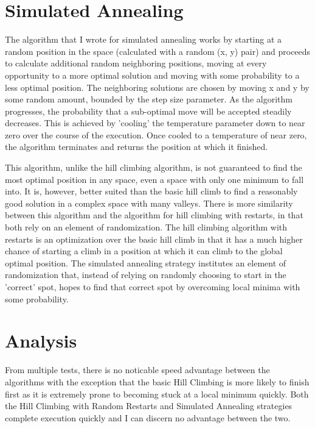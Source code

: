 \documentclass[11pt]{article} %
\begin{document}
\section{Simulated Annealing}

The algorithm that I wrote for simulated annealing works by starting at a random position in the space (calculated with a random (x, y) pair) and proceeds to calculate additional random neighboring positions, moving at every opportunity to a more optimal solution and moving with some probability to a less optimal position. The neighboring solutions are chosen  by moving x and y by some random amount, bounded by the step size parameter. As the algorithm progresses, the probability that a sub-optimal move will be accepted steadily decreases. This is achieved by 'cooling' the temperature parameter down to near zero over the course of the execution. Once cooled to a temperature of near zero, the algorithm terminates and returns the position at which it finished.

This algorithm, unlike the hill climbing algorithm, is not guaranteed to find the most optimal position in any space, even a space with only one minimum to fall into. It is, however, better suited than the basic hill climb to find a reasonably good solution in a complex space with many valleys. There is more similarity between this algorithm and the algorithm for hill climbing with restarts, in that both rely on an element of randomization. The hill climbing algorithm with restarts is an optimization over the basic hill climb in that it has a much higher chance of starting a climb in a position at which it can climb to the global optimal position. The simulated annealing strategy institutes an element of randomization that, instead of relying on randomly choosing to start in the 'correct' spot, hopes to find that correct spot by overcoming local minima with some probability. 

\section{Analysis}

From multiple tests, there is no noticable speed advantage between the algorithms with the exception that the basic Hill Climbing is more likely to finish first as it is extremely prone to becoming stuck at a local minimum quickly. Both the Hill Climbing with Random Restarts and Simulated Annealing strategies complete execution quickly and I can discern no advantage between the two.
\end{document}
